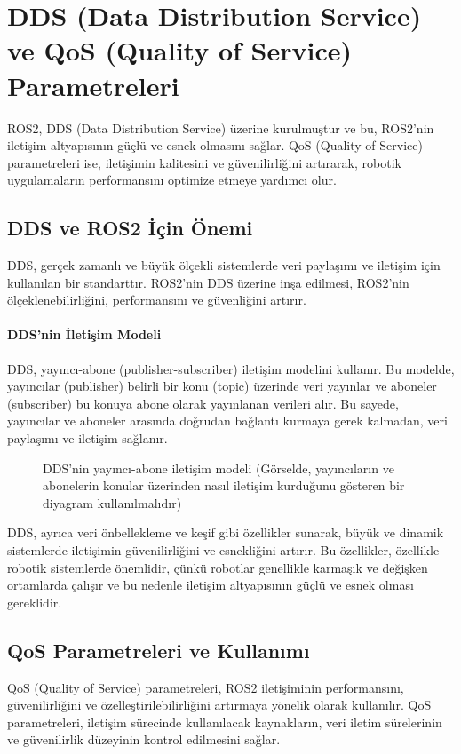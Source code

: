 \section{DDS (Data Distribution Service) ve QoS (Quality of Service) Parametreleri}
ROS2, DDS (Data Distribution Service) üzerine kurulmuştur ve bu, ROS2'nin iletişim altyapısının güçlü ve esnek olmasını sağlar. QoS (Quality of Service) parametreleri ise, iletişimin kalitesini ve güvenilirliğini artırarak, robotik uygulamaların performansını optimize etmeye yardımcı olur.

\subsection{DDS ve ROS2 İçin Önemi}
DDS, gerçek zamanlı ve büyük ölçekli sistemlerde veri paylaşımı ve iletişim için kullanılan bir standarttır. ROS2'nin DDS üzerine inşa edilmesi, ROS2'nin ölçeklenebilirliğini, performansını ve güvenliğini artırır.
\paragraph{DDS'nin İletişim Modeli}
DDS, yayıncı-abone (publisher-subscriber) iletişim modelini kullanır. Bu modelde, yayıncılar (publisher) belirli bir konu (topic) üzerinde veri yayınlar ve aboneler (subscriber) bu konuya abone olarak yayınlanan verileri alır. Bu sayede, yayıncılar ve aboneler arasında doğrudan bağlantı kurmaya gerek kalmadan, veri paylaşımı ve iletişim sağlanır.

\begin{figure}[h]
\centering
\caption{DDS'nin yayıncı-abone iletişim modeli (Görselde, yayıncıların ve abonelerin konular üzerinden nasıl iletişim kurduğunu gösteren bir diyagram kullanılmalıdır)}
\end{figure}

DDS, ayrıca veri önbellekleme ve keşif gibi özellikler sunarak, büyük ve dinamik sistemlerde iletişimin güvenilirliğini ve esnekliğini artırır. Bu özellikler, özellikle robotik sistemlerde önemlidir, çünkü robotlar genellikle karmaşık ve değişken ortamlarda çalışır ve bu nedenle iletişim altyapısının güçlü ve esnek olması gereklidir.

\subsection{QoS Parametreleri ve Kullanımı}
QoS (Quality of Service) parametreleri, ROS2 iletişiminin performansını, güvenilirliğini ve özelleştirilebilirliğini artırmaya yönelik olarak kullanılır. QoS parametreleri, iletişim sürecinde kullanılacak kaynakların, veri iletim sürelerinin ve güvenilirlik düzeyinin kontrol edilmesini sağlar.

